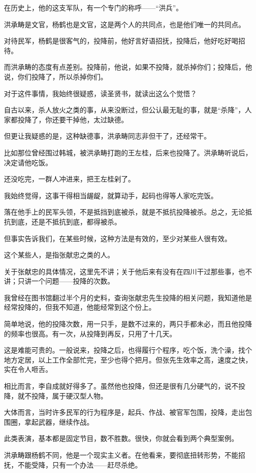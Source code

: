 \begin{multicols}{\theparacolNo}
		在历史上，他的这支军队，有一个专门的称呼——“洪兵”。

		洪承畴是文官，杨鹤也是文官，这是两个人的共同点，也是他们唯一的共同点。

		对待民军，杨鹤是很客气的，投降前，他好言好语招抚，投降后，他好吃好喝招待。

		而洪承畴的态度有点差别。投降前，他说，如果不投降，就杀掉你们；投降后，他说，你们投降了，所以杀掉你们。

		对于这件事情，我始终很疑惑，读圣贤书，就读出这么个觉悟？

		自古以来，杀人放火之类的事，从来没断过，但公认最无耻的事，就是“杀降”，人家都投降了，你还要干掉他，太过缺德。

		但更让我疑惑的是，这种缺德事，洪承畴同志非但干了，还经常干。

		比如那位曾经围过韩城，被洪承畴打跑的王左桂，后来也投降了。洪承畴听说后，决定请他吃饭。

		还没吃完，一群人冲进来，把王左桂剁了。

		我始终觉得，这事干得相当龌龊，就算动手，起码也得等人家吃完饭。

		落在他手上的民军头领，不是抵挡到底被杀，就是不抵抗投降被杀。总之，无论抵抗到底，还是不抵抗到底，都得被杀。

		但事实告诉我们，在某些时候，这种方法是有效的，至少对某些人很有效。

		这个某些人，是指张献忠之类的人。

		关于张献忠的具体情况，这里先不讲；关于他后来有没有在四川干过那些事，也不讲；只讲一个问题——投降的次数。

		我曾经在图书馆翻过半个月的史料，查询张献忠先生投降的相关问题，我知道他是经常投降的，但我不知道，他能经常到这个份上。

		简单地说，他的投降次数，用一只手，是数不过来的，两只手都未必，而且他投降的频率也很高。有一次，从投降到再反，只用了十几天。

		这是难能可贵的。一般说来，投降之后，也得履行个程序，吃个饭，洗个澡，找个地方定居，以上工作全部忙完，至少也得个把月。但张先生效率之高，速度之快，实在令人咂舌。

		相比而言，李自成就好得多了。虽然他也投降，但还是很有几分硬气的，说不投降，就不投降，属于硬汉型人物。

		大体而言，当时许多民军的行为程序是，起兵、作战、被官军包围，投降，走出包围圈，拿起武器，继续作战。

		此类表演，基本都是固定节目，数不胜数。很快，你就会看到两个典型案例。

		洪承畴跟杨鹤不同，他是一个现实主义者。在他看来，要彻底扭转形势，不能招抚，不能受降，只有一个办法——赶尽杀绝。


\end{multicols}
